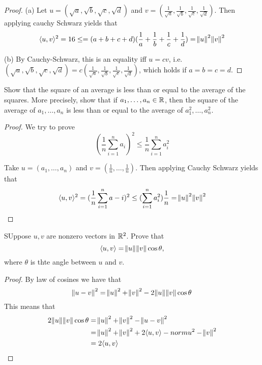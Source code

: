 \documentclass{extarticle}
\begin{document}
\begin{proof}
(a) Let \(u = (\sqrt{a},\sqrt{b},\sqrt{c},\sqrt{d})\) and \(v = 
(\frac{1}{\sqrt{a}}, \frac{1}{\sqrt{b}}, \frac{1}{\sqrt{c}}, \frac{1}{\sqrt{d}})\). Then applying 
cauchy Schwarz yields that 
\begin{align*}
    \langle u,v \rangle^2 = 16 \leq = (a+b+c+d)(\frac{1}{a}+\frac{1}{b}+\frac{1}{c}+\frac{1}{d})= \norm{u}^2 \norm{v}^2
\end{align*}

(b) By Cauchy-Schwarz, this is an equality iff \(u = cv\), i.e. \((\sqrt{a}, \sqrt{b}, \sqrt{c}, \sqrt{d}) 
= c (\frac{1}{\sqrt{a}}, \frac{1}{\sqrt{b}}, \frac{1}{\sqrt{c}}, \frac{1}{\sqrt{d}})\), which holds 
if \(a=b=c=d\).

\end{proof}


\begin{problem}{13}
    Show that the square of an average is less than or equal to the average of the squares. More 
    precisely, show that if \(a_1, \ldots, a_n \in \mathbb{R}\), then the square of the average of 
    \(a_1, \ldots, a_n\) is less than or equal to the average of \(a_1^2, \ldots, a_n^2\).
\end{problem}

\begin{proof}
We try to prove 
\[(\frac{1}{n} \sum_{i=1}^{n} a_i)^2 \leq \frac{1}{n} \sum_{i=1}^{n}a_i^2\]

Take \(u = (a_1, \ldots, a_n)\) and \(v = (\frac{1}{n}, \ldots, \frac{1}{n})\). Then applying Cauchy Schwarz yields
that 
\begin{align*}
    \langle u,v \rangle^2 
    = (\frac{1}{n} \sum_{i=1}^{n} a-i)^2 
    \leq (\sum_{i=1}^{n} a_i^2)\frac{1}{n} = \norm{u}^2 \norm{v}^2 
\end{align*}
\end{proof}


\begin{problem}{15}
    SUppose \(u, v\) are nonzero vectors in \(\mathbb{R}^2\). Prove that 
    \[\langle u,v \rangle = \norm{u} \norm{v} \cos \theta ,\]
    where \(\theta\) is thte angle between \(u\) and \(v\).
\end{problem}

\begin{proof}
By law of cosines we have that 
\[\norm{u - v}^2 = \norm{u}^2 + \norm{v}^2 - 2 \norm{u}\norm{v}\cos \theta\]
This means that 
\begin{align*}
    2 \norm{u} \norm{v}\cos \theta 
    &= \norm{u}^2 + \norm{v}^2 - \norm{u - v}^2 \\ 
    &= \norm{u}^2 + \norm{v}^2 + 2 \langle u,v \rangle - norm{u}^2 - \norm{v}^2 \\ 
    &= 2 \langle u,v \rangle
\end{align*}
\end{proof}
\end{document}
